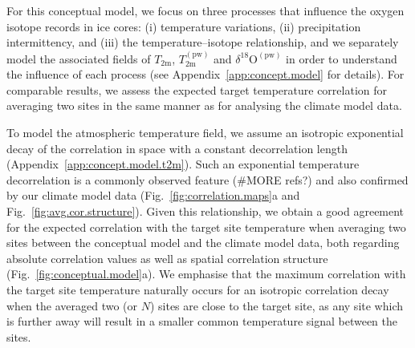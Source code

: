 \documentclass[cp, manuscript]{copernicus}
\begin{document}
For this conceptual model, we focus on three processes that influence the oxygen
isotope records in ice cores: (i) temperature variations, (ii) precipitation
intermittency, and (iii) the temperature--isotope relationship, and we
separately model the associated fields of $T_{\mathrm{2m}}$,
$T_{2\mathrm{m}}^{\mathrm{(pw)}}$ and $\delta^{18}\mathrm{O}^{\mathrm{(pw)}}$ in
order to understand the influence of each process (see
Appendix~\ref{app:concept.model} for details). For comparable results, we assess
the expected target temperature correlation for averaging two sites in the same
manner as for analysing the climate model data.

To model the atmospheric temperature field, we assume an isotropic exponential
decay of the correlation in space with a constant decorrelation length
(Appendix~\ref{app:concept.model.t2m}). Such an exponential temperature
decorrelation is a commonly observed feature \citep{Jones1997} (\#MORE refs?)
and also confirmed by our climate model data (Fig.~\ref{fig:correlation.maps}a
and Fig.~\ref{fig:avg.cor.structure}). Given this relationship, we obtain a good
agreement for the expected correlation with the target site temperature when
averaging two sites between the conceptual model and the climate model data,
both regarding absolute correlation values as well as spatial correlation
structure (Fig.~\ref{fig:conceptual.model}a). We emphasise that the maximum
correlation with the target site temperature naturally occurs for an isotropic
correlation decay when the averaged two (or $N$) sites are close to the target
site, as any site which is further away will result in a smaller common
temperature signal between the sites.
\end{document}
